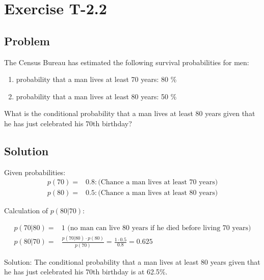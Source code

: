 \section*{Exercise T-2.2}

\subsection*{Problem}
The Census Bureau has estimated the following survival probabilities for men:
\begin{enumerate}
	\item probability that a man lives at least 70 years: 80 \%
	\item probability that a man lives at least 80 years: 50 \%
\end{enumerate}

What is the conditional probability that a man lives at least 80 years given that he has just celebrated his 70th birthday?

\subsection*{Solution}

Given probabilities:
\begin{align}
	p(70) =& 0.8: \text{(Chance a man lives at least 70 years)} \nonumber \\
	p(80) =& 0.5: \text{(Chance a man lives at least 80 years)} \nonumber
\end{align}

Calculation of $p(80|70)$:

\begin{align}
	p(70|80) =& 1 \text{ (no man can live 80 years if he died before living 70 years)} \nonumber \\
	p(80|70) =& \frac{p(70|80)\cdot p(80)}{p(70)} = \frac{1\cdot 0.5}{0.8} = 0.625 \nonumber
\end{align}


Solution: The conditional probability that a man lives at least 80 years given that he has just celebrated his 70th birthday is at 62.5\%.